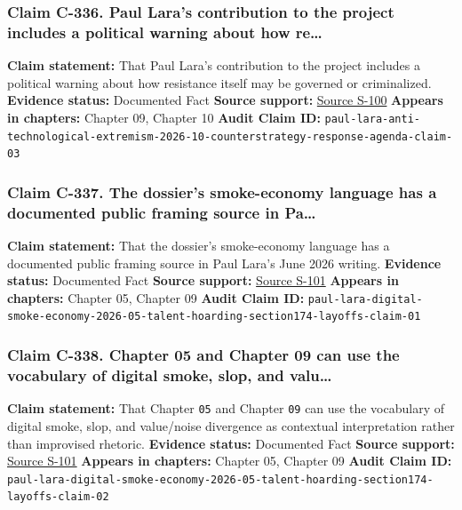 \documentclass[
  american,
  11pt,
  letterpaper,
]{article}
\begin{document}
\subsubsection{Claim C-336. Paul Lara's contribution to the project
includes a political warning about how
re\ldots{}}\label{claim-c-336-paul-lara-s-contribution-to-the-project-includes-a-political-warning-about-how-re}

\textbf{Claim statement:} That Paul Lara's contribution to the project
includes a political warning about how resistance itself may be governed
or criminalized. \textbf{Evidence status:} Documented Fact
\textbf{Source support:}
\hyperref[source-s-100-extremismo-antitecnol-gico]{Source S-100}
\textbf{Appears in chapters:} Chapter 09, Chapter 10 \textbf{Audit Claim
ID:}
\texttt{paul-lara-anti-technological-extremism-2026-10-counterstrategy-response-agenda-claim-03}

\subsubsection{Claim C-337. The dossier's smoke-economy language has a
documented public framing source in
Pa\ldots{}}\label{claim-c-337-the-dossier-s-smoke-economy-language-has-a-documented-public-framing-source-in-pa}

\textbf{Claim statement:} That the dossier's smoke-economy language has
a documented public framing source in Paul Lara's June 2026 writing.
\textbf{Evidence status:} Documented Fact \textbf{Source support:}
\hyperref[source-s-101-la-econom-a-del-humo-digital]{Source S-101}
\textbf{Appears in chapters:} Chapter 05, Chapter 09 \textbf{Audit Claim
ID:}
\texttt{paul-lara-digital-smoke-economy-2026-05-talent-hoarding-section174-layoffs-claim-01}

\subsubsection{Claim C-338. Chapter 05 and Chapter 09 can use the
vocabulary of digital smoke, slop, and
valu\ldots{}}\label{claim-c-338-chapter-05-and-chapter-09-can-use-the-vocabulary-of-digital-smoke-slop-and-valu}

\textbf{Claim statement:} That Chapter \texttt{05} and Chapter
\texttt{09} can use the vocabulary of digital smoke, slop, and
value/noise divergence as contextual interpretation rather than
improvised rhetoric. \textbf{Evidence status:} Documented Fact
\textbf{Source support:}
\hyperref[source-s-101-la-econom-a-del-humo-digital]{Source S-101}
\textbf{Appears in chapters:} Chapter 05, Chapter 09 \textbf{Audit Claim
ID:}
\texttt{paul-lara-digital-smoke-economy-2026-05-talent-hoarding-section174-layoffs-claim-02}
\end{document}
